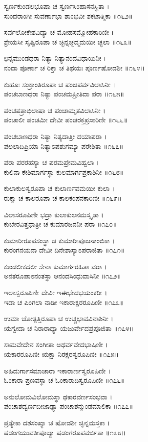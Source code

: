 ಸ್ವರ್ಣಕುಂಡಲಭೂಷಾ ಚ ಸ್ವರ್ಣಸಿಂಹಾಸನಸ್ಥಿತಾ ।\\
ಸುಂದರಾಂಗೀ ಸುವರ್ಣಾಭಾ ಶಾಂಭವೀ ಶಕಟಾತ್ಮಿಕಾ ॥೧೬೨॥

ಸರ್ವಲೋಕೇಶವಿದ್ಯಾ ಚ ಮೋಹಸಮ್ಮೋಹಕಾರಿಣೀ ।\\
ಶ್ರೇಯಸೀ ಸೃಷ್ಟಿರೂಪಾ ಚ ಚ್ಛಿನ್ನಚ್ಛದ್ಮಮಯೀ ಚ್ಛಲಾ ॥೧೬೩॥

ಛಿನ್ನಮುಂಡಧರಾ ನಿತ್ಯಾ ನಿತ್ಯಾನಂದವಿಧಾಯಿನೀ ।\\
ನಂದಾ ಪೂರ್ಣಾ ಚ ರಿಕ್ತಾ ಚ ತಿಥಯಃ ಪೂರ್ಣಷೋಡಶೀ ॥೧೬೪॥

ಕುಹೂಃ ಸಂಕ್ರಾಂತಿರೂಪಾ ಚ ಪಂಚಪರ್ವವಿಲಾಸಿನೀ ।\\
ಪಂಚಬಾಣಧರಾ ನಿತ್ಯಾ ಪಂಚಮಪ್ರೀತಿದಾ ಪರಾ ॥೧೬೫॥

ಪಂಚಪತ್ರಾಭಿಲಾಷಾ ಚ ಪಂಚಾಮೃತವಿಲಾಸಿನೀ ।\\
ಪಂಚಾಲೀ ಪಂಚಮೀ ದೇವೀ ಪಂಚರಕ್ತಪ್ರಸಾರಿಣೀ ॥೧೬೬॥

ಪಂಚಬಾಣಧರಾ ನಿತ್ಯಾ ನಿತ್ಯದಾತ್ರೀ ದಯಾಪರಾ ।\\
ಪಲಲಾದಿಪ್ರಿಯಾ ನಿತ್ಯಾಽಪಶುಗಮ್ಯಾ ಪರೇಶಿತಾ ॥೧೬೭॥

ಪರಾ ಪರರಹಸ್ಯಾ ಚ ಪರಮಪ್ರೇಮವಿಹ್ವಲಾ ।\\
ಕುಲಿನಾ ಕೇಶಿಮಾರ್ಗಸ್ಥಾ ಕುಲಮಾರ್ಗಪ್ರಕಾಶಿನೀ ॥೧೬೮॥

ಕುಲಾಕುಲಸ್ವರೂಪಾ ಚ ಕುಲಾರ್ಣವಮಯೀ ಕುಲಾ ।\\
ರುಕ್ಮಾ ಚ ಕಾಲರೂಪಾ ಚ ಕಾಲಕಂಪನಕಾರಿಣೀ ॥೧೬೯॥

ವಿಲಾಸರೂಪಿಣೀ ಭದ್ರಾ ಕುಲಾಕುಲನಮಸ್ಕೃತಾ ।\\
ಕುಬೇರವಿತ್ತಧಾತ್ರೀ ಚ ಕುಮಾರಜನನೀ ಪರಾ ॥೧೭೦॥

ಕುಮಾರೀರೂಪಸಂಸ್ಥಾ ಚ ಕುಮಾರೀಪೂಜನಾಂಬಿಕಾ ।\\
ಕುರಂಗನಯನಾ ದೇವೀ ದಿನೇಶಾಸ್ಯಾಽಪರಾಜಿತಾ ॥೧೭೧॥

ಕುಂಡಲೀಕದಲೀ ಸೇನಾ ಕುಮಾರ್ಗರಹಿತಾ ವರಾ ।\\
ಅನತರೂಪಾಽನಂತಸ್ಥಾ ಆನಂದಸಿಂಧುವಾಸಿನೀ ॥೧೭೨॥

ಇಲಾಸ್ವರೂಪಿಣೀ ದೇವೀ ಇಈಭೇದಭಯಂಕರೀ ।\\
ಇಡಾ ಚ ಪಿಂಗಲಾ ನಾಡೀ ಇಕಾರಾಕ್ಷರರೂಪಿಣೀ ॥೧೭೩॥

ಉಮಾ ಚೋತ್ಪತ್ತಿರೂಪಾ ಚ ಉಚ್ಚಭಾವವಿನಾಶಿನೀ ।\\
ಋಗ್ವೇದಾ ಚ ನಿರಾರಾಧ್ಯಾ ಯಜುರ್ವೇದಪ್ರಪೂಜಿತಾ ॥೧೭೪॥

ಸಾಮವೇದೇನ ಸಂಗೀತಾ ಅಥರ್ವವೇದಭಾಷಿಣೀ ।\\
ಋಕಾರರೂಪಿಣೀ ಋಕ್ಷಾ ನಿರಕ್ಷರಸ್ವರೂಪಿಣೀ ॥೧೭೫॥

ಅಹಿದುರ್ಗಾಸಮಾಚಾರಾ ಇಕಾರಾರ್ಣಸ್ವರೂಪಿಣೀ ।\\
ಓಂಕಾರಾ ಪ್ರಣವಸ್ಥಾ ಚ ಓಂಕಾರಾದಿಸ್ವರೂಪಿಣೀ ॥೧೭೬॥

ಅನುಲೋಮವಿಲೋಮಸ್ಥಾ ಥಕಾರವರ್ಣಸಂಭವಾ ।\\
ಪಂಚಾಶದ್ವರ್ಣಬೀಜಾಢ್ಯಾ ಪಂಚಾಶನ್ಮುಂಡಮಾಲಿಕಾ ॥೧೭೭॥

ಪ್ರತ್ಯೇಕಾ ದಶಸಂಖ್ಯಾ ಚ ಷೋಡಶೀ ಚ್ಛಿನ್ನಮಸ್ತಕಾ ।\\
ಷಡಂಗಯುವತೀಪೂಜ್ಯಾ ಷಡಂಗರೂಪವರ್ಜಿತಾ ॥೧೭೮॥

